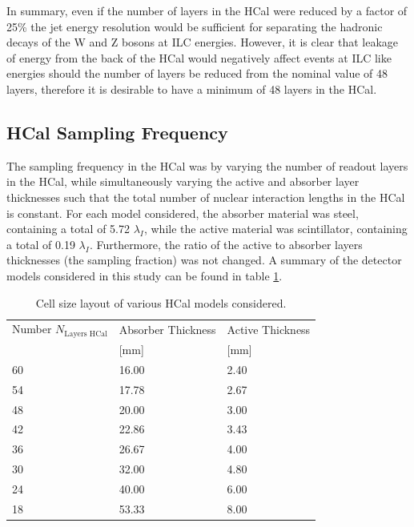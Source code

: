 In summary, even if the number of layers in the HCal were reduced by a factor of 25\% the jet energy resolution would be sufficient for separating the hadronic decays of the W and Z bosons at ILC energies.  However, it is clear that leakage of energy from the back of the HCal would negatively affect events at ILC like energies should the number of layers be reduced from the nominal value of 48 layers, therefore it is desirable to have a minimum of 48 layers in the HCal.
  

\subsection{HCal Sampling Frequency}
\label{sec:hcalsamplingfrequency}
The sampling frequency in the HCal was by varying the number of readout layers in the HCal, while simultaneously varying the active and absorber layer thicknesses such that the total number of nuclear interaction lengths in the HCal is constant.  For each model considered, the absorber material was steel, containing a total of 5.72 $\lambda_{I}$, while the active material was scintillator, containing a total of 0.19 $\lambda_{I}$.  Furthermore, the ratio of the active to absorber layers thicknesses (the sampling fraction) was not changed.  A summary of the detector models considered in this study can be found in table \ref{table:nlayershcaloption}.  

\begin{table}[h!]
\centering
\begin{tabular}{ l l l }
\hline
Number $N_{\text{Layers HCal}}$& Absorber Thickness & Active Thickness \\
 & [mm] & [mm] \\
\hline
60 & 16.00 & 2.40 \\ 
54 & 17.78 & 2.67 \\
48 & 20.00 & 3.00 \\
42 & 22.86 & 3.43 \\
36 & 26.67 & 4.00 \\
30 & 32.00 & 4.80 \\
24 & 40.00 & 6.00 \\
18 & 53.33 & 8.00 \\
\hline
\end{tabular}
\caption[Cell size layout of various HCal models considered.]{Cell size layout of various HCal models considered.}
\label{table:nlayershcaloption}
\end{table}

